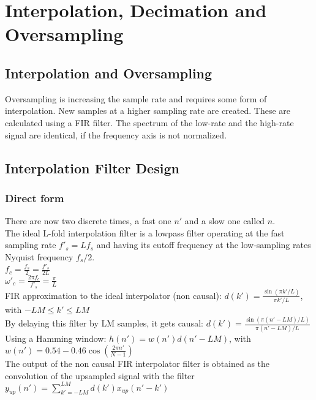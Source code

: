 \section{Interpolation, Decimation and Oversampling}
\subsection{Interpolation and Oversampling}
Oversampling is increasing the sample rate and requires some form of interpolation. New samples at a higher sampling rate are created. These are calculated using a FIR filter. The spectrum of the low-rate and the high-rate signal are identical, if the frequency axis is not normalized.

\subsection{Interpolation Filter Design}
\subsubsection{Direct form}
There are now two discrete times, a fast one $n'$ and a slow one called $n$.\\
The ideal L-fold interpolation filter is a lowpass filter operating at the fast sampling rate $f'_s=Lf_s$ and having its cutoff frequency at the low-sampling rates Nyquist frequency $f_s/2$.\\
$f_c=\frac{f_s}{2}=\frac{f'_s}{2L}$\\
$\omega'_c=\frac{2\pi f_c}{f'_s}=\frac{\pi}{L}$\\
FIR approximation to the ideal interpolator (non causal): $d(k')=\frac{\sin(\pi k'/L)}{\pi k'/L}$, with $-LM\leq k'\leq LM$\\
By delaying this filter by LM samples, it gets causal: $d(k')=\frac{\sin(\pi (n'-LM)/L)}{\pi (n'-LM)/L}$\\
Using a Hamming window: $h(n')=w(n')d(n'-LM)$, with $w(n') = 0.54-0.46\cos(\frac{2\pi n'}{N-1})$\\
The output of the non causal FIR interpolator filter is obtained as the convolution of the upsampled signal with the filter $y_{up}(n') = \sum\limits_{k'=-LM}^{LM}d(k')x_{up}(n'-k')$\\
